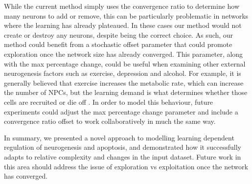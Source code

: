 While the current method simply uses the convergence ratio to determine how many neurons 
to add or remove, this can be particularly problematic in networks where the learning  
has already plateaued. 
In these cases our method would not create or destroy any neurons, despite 
being the correct choice. 
As such, our method could benefit from a stochastic offset 
parameter that could promote exploration once the network size has already converged. 
This parameter, along with the max percentage change, could be useful when examining other 
external neurogenesis factors such as exercise, depression and alcohol. 
For example, it is generally believed that exercise increases the metabolic rate, 
which can increase the number of \acp{NPC}, but the learning demand 
is what determines whether those cells are recruited or 
die off \citep{enrichment-activity-interactions}. 
In order to model this behaviour, future experiments could adjust the max percentage change 
parameter and include a convergence ratio offset to work collaboratively in much the same way.

In summary, we presented a novel approach to modelling learning dependent regulation 
of neurogenesis and apoptosis, and demonstrated how it successfully adapts to 
relative complexity and changes in the input dataset. 
Future work in this area should 
address the issue of exploration vs exploitation once the 
network has converged. 
